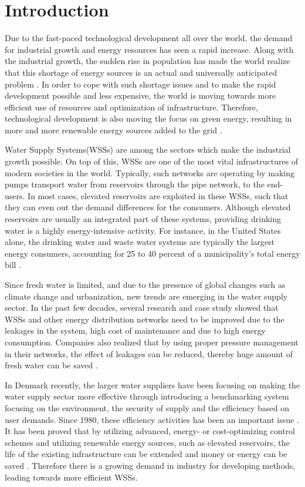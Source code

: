 \chapter{Introduction}
\label{introduction}

Due to the fast-paced technological development all over the world, the demand for industrial growth and energy resources has seen a rapid increase. Along with the industrial growth, the sudden rise in population has made the world realize that this shortage of energy sources is an actual and universally anticipated problem \cite{sustainable_water}. In order to cope with such shortage issues and to make the rapid development possible and less expensive, the world is moving towards more efficient use of resources and optimization of infrastructure. Therefore, technological development is also moving the focus on green energy, resulting in more and more renewable energy sources added to the grid \cite{fluctuating_price}. 

Water Supply Systems(WSSs) are among the sectors which make the industrial growth possible. On top of this, WSSs are one of the most vital infrastructures of modern societies in the world. Typically, such networks are operating by making pumps transport water from reservoirs through the pipe network, to the end-users. In most cases, elevated reservoirs are exploited in these WSSs, such that they can even out the demand differences for the consumers. Although elevated reservoirs are usually an integrated part of these systems, providing drinking water is a highly energy-intensive activity. For instance, in the United States alone, the drinking water and waste water systems are typically the largest energy consumers, accounting for 25 to 40 percent of a municipality's total energy bill \cite{appelbaum2002water}. 

Since fresh water is limited, and due to the presence of global changes such as climate change and urbanization, new trends are emerging in the water supply sector. In the past few decades, several research and case study showed that WSSs and other energy distribution networks need to be improved due to the leakages in the system, high cost of maintenance and due to high energy consumption. Companies also realized that by using proper pressure management in their networks, the effect of leakages can be reduced, thereby huge amount of fresh water can be saved \cite{national2005public}. 

In Denmark recently, the larger water suppliers have been focusing on making the water supply sector more effective through introducing a benchmarking system focusing on the environment, the security of supply and the efficiency based on user demands. Since 1980, these efficiency activities has been an important issue \cite{water_denmark}. It has been proved that by utilizing advanced, energy- or cost-optimizing control schemes and utilizing renewable energy sources, such as elevated reservoirs, the life of the existing infrastructure can be extended and money or energy can be saved \cite{sustainable_water}. Therefore there is a growing demand in industry for developing methods, leading towards more efficient WSSs. 

